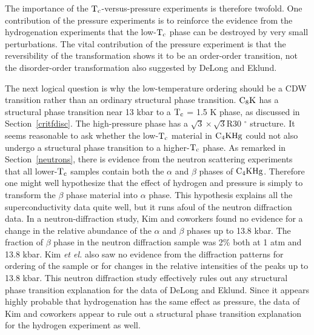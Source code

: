         The  importance of the   $\rm T_c$-versus-pressure   experiments is
therefore twofold.   One contribution of  the  pressure experiments is   to
reinforce the evidence from the hydrogenation experiments that the low-$\rm
T_c$ phase  can be  destroyed by   very  small perturbations.   The   vital
contribution of the  pressure experiment is that  the reversibility  of the
transformation shows    it  to  be   an  order-order  transition,  not  the
disorder-order    transformation   also    suggested      by   DeLong   and
Eklund.\cite{delong83}

        The  next  logical  question  is  why the  low-temperature ordering
should  be a CDW  transition    rather than  an ordinary structural   phase
transition.  $\rm C_8K$ has a structural phase transition near 13 kbar to a
$\rm      T_c$    =     1.5       K       phase,     as   discussed      in
Section~\ref{critfdisc}.\cite{delong83,avdeev87}  The   high-pressure phase
has a $\sqrt{3} \times \sqrt{3}$R30 $^{\circ}$ structure.\cite{clarke84} It
seems reasonable to ask whether the low-$\rm T_c$  material in $\rm C_4KHg$
could not also undergo a structural phase transition  to a higher-$\rm T_c$
phase.  As remarked in  Section~\ref{neutrons}, there is evidence from  the
neutron  scattering experiments  that  all lower-$\rm T_c$ samples  contain
both the $\alpha$ and $\beta$ phases of  $\rm C_4KHg$.  Therefore one might
well hypothesize that the effect  of  hydrogen  and  pressure is simply  to
transform the $\beta$ phase material into  $\alpha$ phase.  This hypothesis
explains  all the superconductivity data  quite well, but  it runs afoul of
the neutron diffraction  data.   In a neutron-diffraction  study,   Kim and
coworkers found no evidence for  a change in the  relative abundance of the
$\alpha$  and $\beta$ phases up  to 13.8 kbar.\cite{kim84} The  fraction of
$\beta$ phase in the neutron diffraction sample was 2\%  both  at 1 atm and
13.8 kbar.  Kim {\em et el.\/}  also  saw no evidence from  the diffraction
patterns   for ordering of   the sample or   for  changes  in  the relative
intensities  of the peaks  up    to 13.8  kbar.\cite{kim84}   This  neutron
diffraction  study effectively rules out any  structural  phase  transition
explanation for  the  data of DeLong  and  Eklund.\cite{delong83} Since  it
appears highly probable that hydrogenation has the same effect as pressure,
the data of   Kim and coworkers   appear  to rule  out a  structural  phase
transition explanation for the hydrogen experiment as well.

